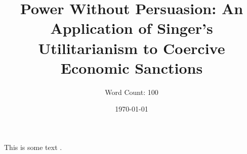 \documentclass[12pt]{article}
\title{Power Without Persuasion: An Application of Singer's Utilitarianism to Coercive Economic Sanctions}
\author{Word Count: 100}
\date{\today}
\begin{document}
\maketitle

This is some text \autocite{singer2016}.

\newpage
\printbibliography
\end{document}
